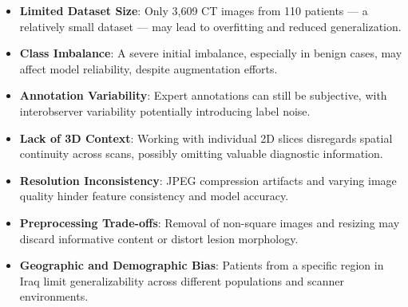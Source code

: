 \begin{itemize}
    \item \textbf{Limited Dataset Size}: Only 3,609 CT images from 110 patients — a relatively
    small dataset — may lead to overfitting and reduced generalization.

    \item \textbf{Class Imbalance}: A severe initial imbalance, especially in benign cases, may 
    affect model reliability, despite augmentation efforts.

    \item \textbf{Annotation Variability}: Expert annotations can still be subjective, with 
    interobserver variability potentially introducing label noise.

    \item \textbf{Lack of 3D Context}: Working with individual 2D slices disregards spatial 
    continuity across scans, possibly omitting valuable diagnostic information.

    \item \textbf{Resolution Inconsistency}: JPEG compression artifacts and varying image quality
    hinder feature consistency and model accuracy.

    \item \textbf{Preprocessing Trade-offs}: Removal of non-square images and resizing may discard
    informative content or distort lesion morphology.

    \item \textbf{Geographic and Demographic Bias}: Patients from a specific region in Iraq limit 
    generalizability across different populations and scanner environments.
\end{itemize}
